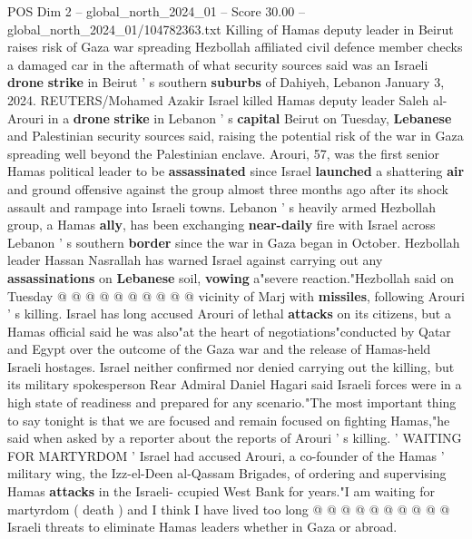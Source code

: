 \begin{textsample}{POS Dim 2 – global\_north\_2024\_01 – Score 30.00 – global\_north\_2024\_01/104782363.txt}  \label{ex:f2_pos_105}
Killing of Hamas deputy leader in Beirut raises risk of Gaza war spreading Hezbollah affiliated civil defence member checks a damaged car in the aftermath of what security sources said was an Israeli \textbf{drone} \textbf{strike} in Beirut ' s southern \textbf{suburbs} of Dahiyeh, Lebanon January 3, 2024.
REUTERS/Mohamed Azakir Israel killed Hamas deputy leader Saleh al-Arouri in a \textbf{drone} \textbf{strike} in Lebanon ' s \textbf{capital} Beirut on Tuesday, \textbf{Lebanese} and Palestinian security sources said, raising the potential risk of the war in Gaza spreading well beyond the Palestinian enclave.
Arouri, 57, was the first senior Hamas political leader to be \textbf{assassinated} since Israel \textbf{launched} a shattering \textbf{air} and ground offensive against the group almost three months ago after its shock assault and rampage into Israeli towns.
Lebanon ' s heavily armed Hezbollah group, a Hamas \textbf{ally}, has been exchanging \textbf{near-daily} fire with Israel across Lebanon ' s southern \textbf{border} since the war in Gaza began in October.
Hezbollah leader Hassan Nasrallah has warned Israel against carrying out any \textbf{assassinations} on \textbf{Lebanese} soil, \textbf{vowing} a"severe reaction."Hezbollah said on Tuesday @ @ @ @ @ @ @ @ @ @ vicinity of Marj with \textbf{missiles}, following Arouri ' s killing.
Israel has long accused Arouri of lethal \textbf{attacks} on its citizens, but a Hamas official said he was also"at the heart of negotiations"conducted by Qatar and Egypt over the outcome of the Gaza war and the release of Hamas-held Israeli hostages.
Israel neither confirmed nor denied carrying out the killing, but its military spokesperson Rear Admiral Daniel Hagari said Israeli forces were in a high state of readiness and prepared for any scenario."The most important thing to say tonight is that we are focused and remain focused on fighting Hamas,"he said when asked by a reporter about the reports of Arouri ' s killing. ' WAITING FOR MARTYRDOM ' Israel had accused Arouri, a co-founder of the Hamas ' military wing, the Izz-el-Deen al-Qassam Brigades, of ordering and supervising Hamas \textbf{attacks} in the Israeli- ccupied West Bank for years."I am waiting for martyrdom ( death ) and I think I have lived too long @ @ @ @ @ @ @ @ @ @ Israeli threats to eliminate Hamas leaders whether in Gaza or abroad.

\end{textsample}
